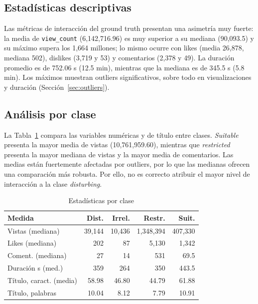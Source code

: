 \documentclass[conference]{IEEEtran}
\begin{document}
\subsection{Estadísticas descriptivas}
Las métricas de interacción del ground truth presentan una asimetría muy fuerte: la media de \texttt{view\_count} (6,142,716.96) es muy superior a su mediana (90,093.5) y su máximo supera los 1,664 millones; lo mismo ocurre con likes (media 26,878, mediana 502), dislikes (3,719 y 53) y comentarios (2,378 y 49). La duración promedio es de 752.06 s (12.5 min), mientras que la mediana es de 345.5 s (5.8 min). Los máximos muestran outliers significativos, sobre todo en visualizaciones y duración (Sección~\ref{sec:outliers}).

\subsection{Análisis por clase}
La Tabla~\ref{tab:clase} compara las variables numéricas y de título entre clases. \textit{Suitable} presenta la mayor media de vistas (10,761,959.60), mientras que \textit{restricted} presenta la mayor mediana de vistas y la mayor media de comentarios. Las medias están fuertemente afectadas por outliers, por lo que las medianas ofrecen una comparación más robusta. Por ello, no es correcto atribuir el mayor nivel de interacción a la clase \textit{disturbing}.

\begin{table}[!t]
\caption{Estadísticas por clase}
\begin{center}
\footnotesize
\setlength{\tabcolsep}{3pt}
\begin{tabular}{|l|r|r|r|r|}
\hline
\textbf{Medida} & \textbf{Dist.} & \textbf{Irrel.} & \textbf{Restr.} & \textbf{Suit.} \\
\hline
Vistas (mediana) & 39,144 & 10,436 & 1,348,394 & 407,330 \\
\hline
Likes (mediana) & 202 & 87 & 5,130 & 1,342 \\
\hline
Coment. (mediana) & 27 & 14 & 531 & 69.5 \\
\hline
Duración s (med.) & 359 & 264 & 350 & 443.5 \\
\hline
Título, caract. (media) & 58.98 & 46.80 & 44.79 & 61.88 \\
\hline
Título, palabras & 10.04 & 8.12 & 7.79 & 10.91 \\
\hline
\end{tabular}
\label{tab:clase}
\end{center}
\end{table}
\end{document}
